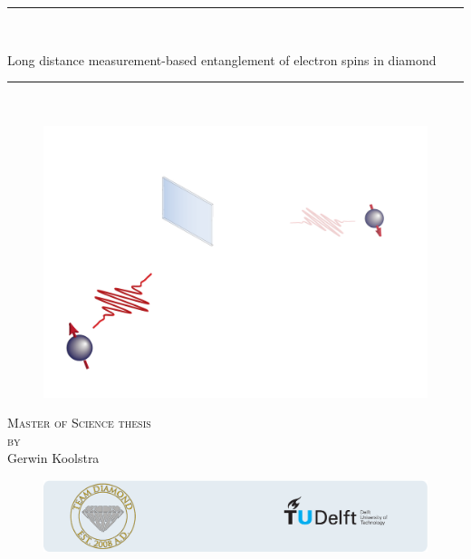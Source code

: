\documentclass[a4paper,10pt]{report}
\begin{document}
\newcommand{\HRule}{\rule{\linewidth}{0.5mm}}

\thispagestyle{empty}
\HRule \\[0cm]
\begin{center}
	\Huge{\textsf{Long distance measurement-based entanglement of electron spins in diamond}}
\end{center}
\vspace{0.25cm}
\HRule \\[0cm]
\vspace{0.15in}

\begin{figure}[h]
	\centering
	\includegraphics[width = \textwidth]{cover.pdf}
\end{figure}

\begin{center}
\textsc{Master of Science thesis}\\
\textsc{by} \\
\LARGE{\textsf{Gerwin Koolstra}}
\end{center}
\vspace{0.15in}

\begin{figure}[h]
	\centering
	\includegraphics[width = \textwidth]{logos.pdf}
\end{figure}
\vspace{0.15in}
\end{document}
